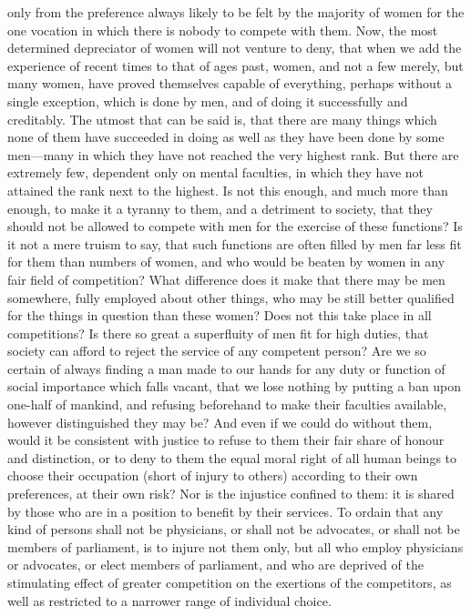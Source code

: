 \documentclass[12pt]{report}
\begin{document}
only from the preference always likely to be felt by the majority of women for the one vocation in which there is nobody to compete with them. Now, the most determined depreciator of women will not venture to deny, that when we add the experience of recent times to that of ages past, women, and not a few merely, but many women, have proved themselves capable of everything, perhaps without a single exception, which is done by men, and of doing it successfully and creditably. The utmost that can be said is, that there are many things which none of them have succeeded in doing as well as they have been done by some men—many in which they have not reached the very highest rank. But there are extremely few, dependent only on mental faculties, in which they have not attained the rank next to the highest. Is not this enough, and much more than enough, to make it a tyranny to them, and a detriment to society, that they should not be allowed to compete with men for the exercise of these functions? Is it not a mere truism to say, that such functions are often filled by men far less fit for them than numbers of women, and who would be beaten by women in any fair field of competition? What difference does it make that there may be men somewhere, fully employed about other things, who may be still better qualified for the things in question than these women? Does not this take place in all competitions? Is there so great a superfluity of men fit for high duties, that society can afford to reject the service of any competent person? Are we so certain of always finding a man made to our hands for any duty or function of social importance which falls vacant, that we lose nothing by putting a ban upon one-half of mankind, and refusing beforehand to make their faculties available, however distinguished they may be? And even if we could do without them, would it be consistent with justice to refuse to them their fair share of honour and distinction, or to deny to them the equal moral right of all human beings to choose their occupation (short of injury to others) according to their own preferences, at their own risk? Nor is the injustice confined to them: it is shared by those who are in a position to benefit by their services. To ordain that any kind of persons shall not be physicians, or shall not be advocates, or shall not be members of parliament, is to injure not them only, but all who employ physicians or advocates, or elect members of parliament, and who are deprived of the stimulating effect of greater competition on the exertions of the competitors, as well as restricted to a narrower range of individual choice.
\end{document}

